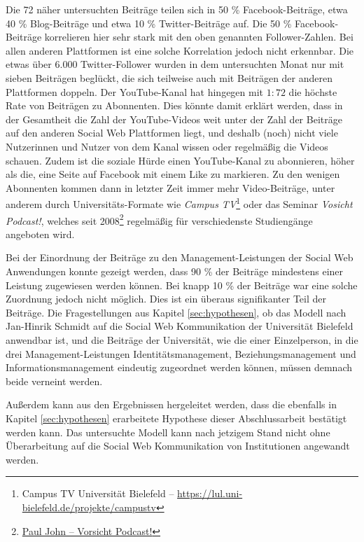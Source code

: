 Die 72 näher untersuchten Beiträge teilen sich in 50 \% Facebook-Beiträge, etwa 40 \% Blog-Beiträge und etwa 10 \% Twitter-Beiträge auf. Die 50 \% Facebook-Beiträge korrelieren hier sehr stark mit den oben genannten Follower-Zahlen. Bei allen anderen Plattformen ist eine solche Korrelation jedoch nicht erkennbar. Die etwas über 6.000 Twitter-Follower wurden in dem untersuchten Monat nur mit sieben Beiträgen beglückt, die sich teilweise auch mit Beiträgen der anderen Plattformen doppeln. Der YouTube-Kanal hat hingegen mit $1:72$ die höchste Rate von Beiträgen zu Abonnenten. Dies könnte damit erklärt werden, dass in der Gesamtheit die Zahl der YouTube-Videos weit unter der Zahl der Beiträge auf den anderen Social Web Plattformen liegt, und deshalb (noch) nicht viele Nutzerinnen und Nutzer von dem Kanal wissen oder regelmäßig die Videos schauen. Zudem ist die soziale Hürde einen YouTube-Kanal zu abonnieren, höher als die, eine Seite auf Facebook mit einem Like zu markieren. Zu den wenigen Abonnenten kommen dann in letzter Zeit  immer mehr Video-Beiträge, unter anderem durch Universitäts-Formate wie \textit{Campus TV}\footnote{Campus TV Universität Bielefeld -- \url{https://lul.uni-bielefeld.de/projekte/campustv}} oder das Seminar \textit{Vosicht Podcast!}, welches seit 2008\footnote{\href{https://uni-bielefeld.de/kvv_publ/publ/Lehrende_Veranstaltungen.jsp?personId=3772740}{Paul John -- Vorsicht Podcast!}} regelmäßig für verschiedenste Studiengänge angeboten wird.


Bei der Einordnung der Beiträge zu den Management-Leistungen der Social Web Anwendungen konnte gezeigt werden, dass 90 \% der Beiträge mindestens einer Leistung zugewiesen werden können. Bei knapp 10 \% der Beiträge war eine solche Zuordnung jedoch nicht möglich. Dies ist ein überaus signifikanter Teil der Beiträge. Die Fragestellungen aus Kapitel \ref{sec:hypothesen}, ob das Modell nach Jan-Hinrik Schmidt auf die Social Web Kommunikation der Universität Bielefeld anwendbar ist, und die Beiträge der Universität, wie die einer Einzelperson, in die drei Management-Leistungen Identitätsmanagement, Beziehungsmanagement und Informationsmanagement eindeutig zugeordnet werden können, müssen demnach beide verneint werden. 

Außerdem kann aus den Ergebnissen hergeleitet werden, dass die ebenfalls in Kapitel \ref{sec:hypothesen} erarbeitete Hypothese dieser Abschlussarbeit bestätigt werden kann. Das untersuchte Modell kann nach jetzigem Stand nicht ohne Überarbeitung auf die Social Web Kommunikation von Institutionen angewandt werden.

